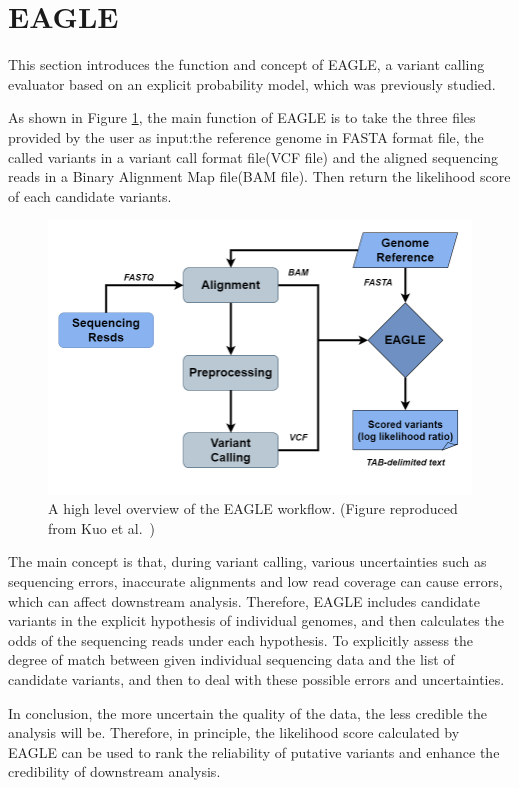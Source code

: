 \documentclass[PhD]{PHlab-thesis}
\begin{document}
\section{EAGLE}
This section introduces the function and concept of EAGLE, a variant calling evaluator based on an explicit probability model, which was previously studied.

As shown in Figure \ref{fig:EAGLE workflow}, the main function of EAGLE is to take the three files provided by the user as input:the reference genome in FASTA format file, the called variants in a variant call format file(VCF file) and the aligned sequencing reads in a Binary Alignment Map file(BAM file). Then return the likelihood score of each candidate variants.

\begin{figure}[h!]
	\centering
	\includegraphics[scale=0.3]{figures/EAGLE.png}
	\caption{A high level overview of the EAGLE workflow. (Figure reproduced from Kuo et al.~\cite{Kuo2018EAGLE})}
	\label{fig:EAGLE workflow} %
\end{figure}

The main concept is that, during variant calling, various uncertainties such as sequencing errors, inaccurate alignments and low read coverage can cause errors, which can affect downstream analysis. Therefore, EAGLE includes candidate variants in the explicit hypothesis of individual genomes, and then calculates the odds of the sequencing reads under each hypothesis. To explicitly assess the degree of match between given individual sequencing data and the list of candidate variants, and then to deal with these possible errors and uncertainties.

In conclusion, the more uncertain the quality of the data, the less credible the analysis will be. Therefore, in principle, the likelihood score calculated by EAGLE can be used to rank the reliability of putative variants and enhance the credibility of downstream analysis.
\end{document}
